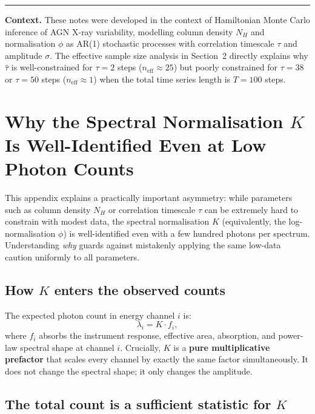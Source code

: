 \documentclass[11pt, a4paper]{article}
\begin{document}
\vspace{12pt}
\noindent\rule{\linewidth}{0.4pt}
{\small
\noindent\textbf{Context.} These notes were developed in the context of Hamiltonian Monte Carlo
inference of AGN X-ray variability, modelling column density $N_H$ and normalisation $\phi$
as AR(1) stochastic processes with correlation timescale $\tau$ and amplitude $\sigma$.
The effective sample size analysis in Section~2 directly explains why $\hat{\tau}$ is
well-constrained for $\tau = 2$ steps ($n_\mathrm{eff} \approx 25$) but poorly constrained
for $\tau = 38$ or $\tau = 50$ steps ($n_\mathrm{eff} \approx 1$) when the total
time series length is $T = 100$ steps.
}

\appendix
\section{Why the Spectral Normalisation $K$ Is Well-Identified Even at Low Photon Counts}
\label{app:K_snr}

This appendix explains a practically important asymmetry: while parameters such as
column density $N_H$ or correlation timescale $\tau$ can be extremely hard to constrain
with modest data, the spectral normalisation $K$ (equivalently, the log-normalisation
$\phi$) is well-identified even with a few hundred photons per spectrum.
Understanding \emph{why} guards against mistakenly applying the same low-data caution
uniformly to all parameters.

\subsection*{How $K$ enters the observed counts}

The expected photon count in energy channel $i$ is:
\begin{equation}
    \lambda_i = K \cdot f_i,
\end{equation}
where $f_i$ absorbs the instrument response, effective area, absorption, and
power-law spectral shape at channel $i$. Crucially, $K$ is a \textbf{pure
multiplicative prefactor} that scales every channel by exactly the same factor
simultaneously. It does not change the spectral shape; it only changes the amplitude.

\subsection*{The total count is a sufficient statistic for $K$}
\end{document}
